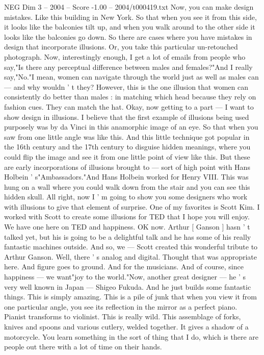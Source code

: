 \begin{textsample}{NEG Dim 3 – 2004 – Score -1.00 – 2004/t000419.txt}
Now, you can make design mistakes.
Like this building in New York.
So that when you see it from this side, it looks like the balconies tilt up, and when you walk around to the other side it looks like the balconies go down.
So there are cases where you have mistakes in design that incorporate illusions.
Or, you take this particular un-retouched photograph.
Now, interestingly enough, I get a lot of emails from people who say,"Is there any perceptual difference between males and females?"And I really say,"No."I mean, women can navigate through the world just as well as males can — and why wouldn ' t they?
However, this is the one illusion that women can consistently do better than males : in matching which head because they rely on fashion cues.
They can match the hat.
Okay, now getting to a part — I want to show design in illusions.
I believe that the first example of illusions being used purposely was by da Vinci in this anamorphic image of an eye.
So that when you saw from one little angle was like this.
And this little technique got popular in the 16th century and the 17th century to disguise hidden meanings, where you could flip the image and see it from one little point of view like this.
But these are early incorporations of illusions brought to — sort of high point with Hans Holbein ' s"Ambassadors."And Hans Holbein worked for Henry VIII.
This was hung on a wall where you could walk down from the stair and you can see this hidden skull.
All right, now I ' m going to show you some designers who work with illusions to give that element of surprise.
One of my favorites is Scott Kim.
I worked with Scott to create some illusions for TED that I hope you will enjoy.
We have one here on TED and happiness.
OK now.
Arthur [ Ganson ] hasn ' t talked yet, but his is going to be a delightful talk and he has some of his really fantastic machines outside.
And so, we — Scott created this wonderful tribute to Arthur Ganson.
Well, there ' s analog and digital.
Thought that was appropriate here.
And figure goes to ground.
And for the musicians.
And of course, since happiness — we want"joy to the world."Now, another great designer — he ' s very well known in Japan — Shigeo Fukuda.
And he just builds some fantastic things.
This is simply amazing.
This is a pile of junk that when you view it from one particular angle, you see its reflection in the mirror as a perfect piano.
Pianist transforms to violinist.
This is really wild.
This assemblage of forks, knives and spoons and various cutlery, welded together.
It gives a shadow of a motorcycle.
You learn something in the sort of thing that I do, which is there are people out there with a lot of time on their hands.

\end{textsample}
